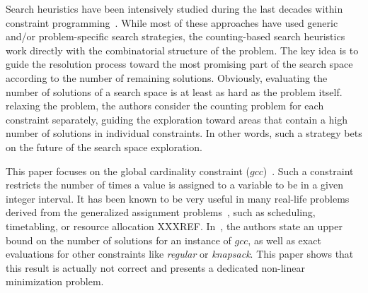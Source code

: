 Search heuristics have been intensively studied during the last decades within constraint programming~\cite{BoussemartHLS04,Refalo04,MichelH12}. While most of these approaches have used generic and/or problem-specific search strategies, the counting\--based search heuristics~\cite{PesantQZ12} work directly with the combinatorial structure of the problem. The key idea is to guide the resolution process toward the most promising part of the search space according to the number of remaining solutions. 
Obviously, evaluating the number of solutions of a search space is at least as hard as the problem itself.
 relaxing the problem, the authors consider the counting problem for each constraint separately, guiding the exploration toward areas that contain a high number of solutions in individual constraints. In other words, such a strategy bets on the future of the search space exploration.

This paper focuses on the global cardinality constraint ($gcc$)~\cite{Regin96}. 
Such a constraint restricts the number of times a value is assigned to a variable to be in a given integer interval. It has been known to be very useful in many real-life problems derived from the generalized assignment problems~\cite{Ford}, such as scheduling, timetabling, or resource allocation XXXREF. 
In~\cite{PesantQZ12}, the authors state an upper bound on the number of solutions for an instance of $gcc$, as well as exact evaluations for other constraints like \emph{regular} or \emph{knapsack}. This paper shows that this result is actually not correct and presents  a dedicated non\--linear minimization problem.  

